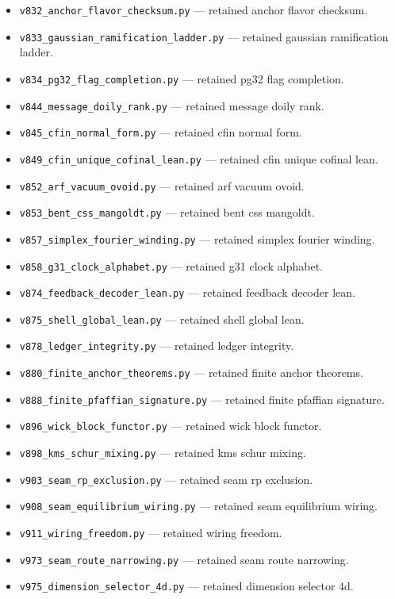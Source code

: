 \documentclass[11pt]{article}
\begin{document}
\begin{itemize}[leftmargin=2em,itemsep=1pt]
\item \texttt{v832\_anchor\_flavor\_checksum.py} --- retained anchor flavor checksum.
\item \texttt{v833\_gaussian\_ramification\_ladder.py} --- retained gaussian ramification ladder.
\item \texttt{v834\_pg32\_flag\_completion.py} --- retained pg32 flag completion.
\item \texttt{v844\_message\_doily\_rank.py} --- retained message doily rank.
\item \texttt{v845\_cfin\_normal\_form.py} --- retained cfin normal form.
\item \texttt{v849\_cfin\_unique\_cofinal\_lean.py} --- retained cfin unique cofinal lean.
\item \texttt{v852\_arf\_vacuum\_ovoid.py} --- retained arf vacuum ovoid.
\item \texttt{v853\_bent\_css\_mangoldt.py} --- retained bent css mangoldt.
\item \texttt{v857\_simplex\_fourier\_winding.py} --- retained simplex fourier winding.
\item \texttt{v858\_g31\_clock\_alphabet.py} --- retained g31 clock alphabet.
\item \texttt{v874\_feedback\_decoder\_lean.py} --- retained feedback decoder lean.
\item \texttt{v875\_shell\_global\_lean.py} --- retained shell global lean.
\item \texttt{v878\_ledger\_integrity.py} --- retained ledger integrity.
\item \texttt{v880\_finite\_anchor\_theorems.py} --- retained finite anchor theorems.
\item \texttt{v888\_finite\_pfaffian\_signature.py} --- retained finite pfaffian signature.
\item \texttt{v896\_wick\_block\_functor.py} --- retained wick block functor.
\item \texttt{v898\_kms\_schur\_mixing.py} --- retained kms schur mixing.
\item \texttt{v903\_seam\_rp\_exclusion.py} --- retained seam rp exclusion.
\item \texttt{v908\_seam\_equilibrium\_wiring.py} --- retained seam equilibrium wiring.
\item \texttt{v911\_wiring\_freedom.py} --- retained wiring freedom.
\item \texttt{v973\_seam\_route\_narrowing.py} --- retained seam route narrowing.
\item \texttt{v975\_dimension\_selector\_4d.py} --- retained dimension selector 4d.

\end{itemize}
\end{document}
